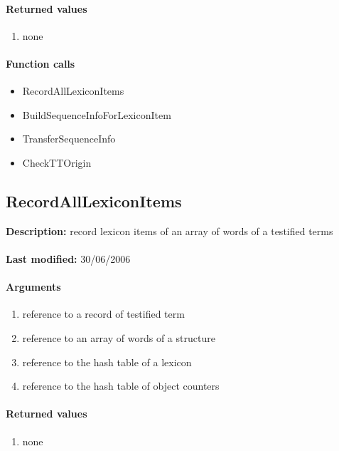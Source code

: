 \paragraph{Returned values}
\begin{enumerate}
\item none
\end{enumerate}

\paragraph{Function calls}
\begin{itemize}
\item RecordAllLexiconItems
\item BuildSequenceInfoForLexiconItem
\item TransferSequenceInfo
\item CheckTTOrigin
\end{itemize}

\subsection{RecordAllLexiconItems}
\textbf{Description:} record lexicon items of an array of words of a testified terms\\
\\\textbf{Last modified:} 30/06/2006

\paragraph{Arguments}
\begin{enumerate}
\item reference to a record of testified term
\item reference to an array of words of a structure
\item reference to the hash table of a lexicon
\item reference to the hash table of object counters
\end{enumerate}

\paragraph{Returned values}
\begin{enumerate}
\item none
\end{enumerate}

